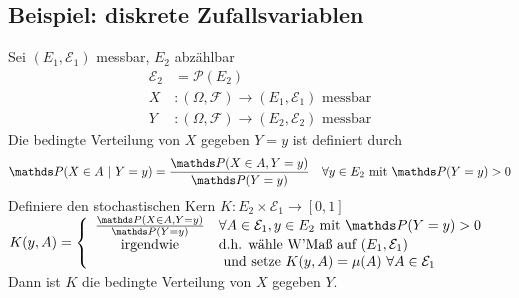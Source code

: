 \subsection{Beispiel: diskrete Zufallsvariablen}
\label{sub:bsp_dis_zv}
Sei $(E_1,\mathcal{E}_1)$ messbar, $E_2$ abzählbar
\begin{equation*}
\begin{aligned}
	\mathcal{E}_2 &= \mathcal{P}(E_2)\\
	X &: (\Omega,\mathcal{F})\to (E_1,\mathcal{E}_1) \text{ messbar}\\
	Y &: (\Omega,\mathcal{F})\to (E_2,\mathcal{E}_2)\text{ messbar}
\end{aligned}
\end{equation*}
Die bedingte Verteilung von $X$ gegeben $Y=y$ ist definiert durch 
\[
\Pw(X\in A~|~Y=y)=\frac{\Pw(X\in A,Y=y)}{\Pw(Y=y)}\quad \forall y\in E_2 \text{ mit } \Pw(Y=y)>0 
\]
Definiere den stochastischen Kern $K: E_2\times \mathcal{E}_1\to [0,1]$\\
$K(y,A)=\left\{\begin{array}{cl} 
\frac{\Pw(X\in A,Y=y)}{\Pw(Y=y)} & \forall A\in \mathcal{E}_1,y\in E_2 \text{ mit }\Pw(Y=y)>0\\
\text{irgendwie} & \text{d.h. wähle W'Maß auf } (E_1,\mathcal{E}_1)\\
& \text{ und setze } K(y,A)=\mu(A)~\forall A\in \mathcal{E}_1  \end{array}\right.$\\

Dann ist $K$ die bedingte Verteilung von $X$ gegeben $Y$.
\newpage

